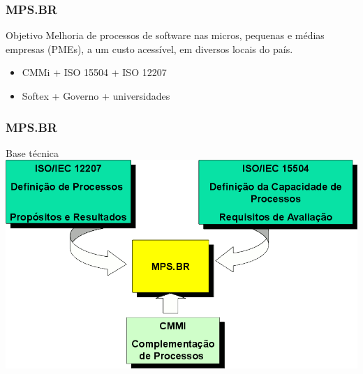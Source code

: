 \begin{frame}[parent={ie:agenda}, hasnext=true, hasprev=false]
	\frametitle{MPS.BR}
	
	\begin{block:concept}{Objetivo}
		Melhoria de processos de software nas micros, pequenas e médias empresas
		(PMEs), a um custo acessível, em diversos locais do país.
	\end{block:concept}
	
	\begin{block:fact}{}
		\begin{itemize}
			\item CMMi + ISO 15504 + ISO 12207
			\item Softex + Governo + universidades
		\end{itemize}
	\end{block:fact}
\end{frame}


\begin{frame}[hasnext=true, hasprev=true]
	\frametitle{MPS.BR}
	
	\begin{block:fact}{Base técnica}
		\centering
		\includegraphics[width=\textwidth]{software-engineering/project-management/process/process-quality/mpsbr/technical-base}
	\end{block:fact}
\end{frame}


